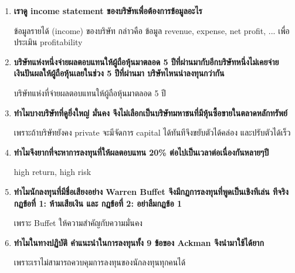 \documentclass[a4paper]{article}
\begin{document}
\begin{enumerate}[label*=\arabic*.]
    \item \textbf{เราดู income statement ของบริษัทเพื่อต้องการข้อมูลอะไร}

    ข้อมูลรายได้ (income) ของบริษัท กล่าวคือ ข้อมูล revenue, expense, net profit, ... เพื่อประเมิน profitability
    \item \textbf{บริษัทแห่งหนึ่งจ่ายผลตอบแทนให้ผู้ถือหุ้นมาตลอด 5 ปีที่ผ่านมากับอีกบริษัทหนึ่งไม่เคยจ่ายเงินปันผลให้ผู้ถือหุ้นเลยในช่วง 5 ปีที่ผ่านมา บริษัทไหนน่าลงทุนกว่ากัน}

    บริษัทแห่งที่จ่ายผลตอบแทนให้ผู้ถือหุ้นมาตลอด 5 ปี
    \item \textbf{ทำไมบางบริษัทที่ดูยิ่งใหญ่ มั่นคง จึงไม่เลือกเป็นบริษัทมหาชนที่มีหุ้นซื้อขายในตลาดหลักทรัพย์}

    เพราะถ้าบริษัทยังคง private จะมีจัดการ capital ได้ทันทีจึงขยับตัวได้คล่อง และปรับตัวได้เร็ว
    \item \textbf{ทำไมจึงยากที่จะหาการลงทุนที่ให้ผลตอบแทน 20\% ต่อไปเป็นเวลาต่อเนื่องกันหลายๆปี}

    high return, high risk
    \item \textbf{ทำไมนักลงทุนที่มีชื่อเสียงอย่าง Warren Buffet จึงมีกฏการลงทุนที่พูดเป็นเชิงทีเล่น ทีจริง กฏข้อที่ 1: ห้ามเสียเงิน และ กฏข้อที่ 2: อย่าลืมกฏข้อ 1}

    เพราะ Buffet ให้ความสำคัญกับความมั่นคง
    \item \textbf{ทำไมในทางปฏิบัติ คำแนะนำในการลงทุนทั้ง 9 ข้อของ Ackman จึงนำมาใช้ได้ยาก}

    เพราะเราไม่สามารถควบคุมการลงทุนของนักลงทุนทุกคนได้
\end{enumerate}
\end{document}
